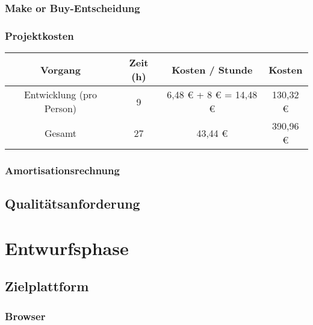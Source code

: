 \documentclass[ngerman,11pt,a4paper,titlepage]{article}
\begin{document}
	\subsubsection{Make or Buy-Entscheidung}
	\label{subsubsec:makeorbuy}
	\makeorbuyText
	
	\subsubsection{Projektkosten}
	\label{subsubsec:projektkosten}
	\projektkostenText
	\neuerAbsatz
	\begin{tabular}{|c|c|c|c|}
		Vorgang & Zeit (h) & Kosten / Stunde & Kosten \\
		\hline
		Entwicklung (pro Person) & 9 & 6,48 € + 8 € = 14,48 € & 130,32 € \\
		\hline
		Gesamt & 27 & 43,44 € & 390,96 €
		\label{tab:tabelle2}
	\end{tabular}
	
	\subsubsection{Amortisationsrechnung}
	\label{subsubsec:amortisationsrechnung}
	\amortisationsrechnungText
	
	\subsection{Qualitätsanforderung}
	\label{subsec:qualitaetsanforderung}
	\qualitaetsanforderungText
	
	\pagebreak
	
	\section{Entwurfsphase}
	\label{sec:entwurfsphase}
	\entwurfsphaseText
	
	\subsection{Zielplattform}
	\label{subsec:zielplattform}
	\zielplattformText
	
	\subsubsection{Browser}
	\label{subsubsec:plattform}
	\plattformText
	
\end{document}
